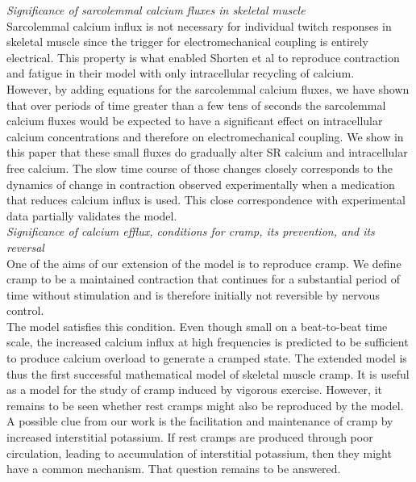 \documentclass[fleqn,10pt]{physiome}
\begin{document}
\textit{Significance of sarcolemmal calcium fluxes in skeletal muscle}\\\newline
Sarcolemmal calcium influx is not necessary for individual twitch responses in skeletal muscle since the trigger for electromechanical coupling is entirely electrical. This property is what enabled Shorten et al\cite{shorten2007mathematical} to reproduce contraction and fatigue in their model with only intracellular recycling of calcium.\\\newline 
However, by adding equations for the sarcolemmal calcium fluxes, we have shown that over periods of time greater than a few tens of seconds the sarcolemmal calcium fluxes would be expected to have a significant effect on intracellular calcium concentrations and therefore on electromechanical coupling. We show in this paper that these small fluxes do gradually alter SR calcium and intracellular free calcium. The slow time course of those changes closely corresponds to the dynamics of change in contraction observed experimentally when a medication that reduces calcium influx is used. This close correspondence with experimental data partially validates the model.\\\newline
\textit{Significance of calcium efflux, conditions for cramp, its prevention, and its reversal}\\\newline
One of the aims of our extension of the model is to reproduce cramp. We define cramp to be a maintained contraction that continues for a substantial period of time without stimulation and is therefore initially not reversible by nervous control.\\\newline 
The model satisfies this condition. Even though small on a beat-to-beat time scale, the increased calcium influx at high frequencies is predicted to be sufficient to produce calcium overload to generate a cramped state. The extended model is thus the first successful mathematical model of skeletal muscle cramp. It is useful as a model for the study of cramp induced by vigorous exercise. However, it remains to be seen whether rest cramps might also be reproduced by the model. A possible clue from our work is the facilitation and maintenance of cramp by increased interstitial potassium. If rest cramps are produced through poor circulation, leading to accumulation of interstitial potassium, then they might have a common mechanism. That question remains to be answered.\\\newline
\end{document}
